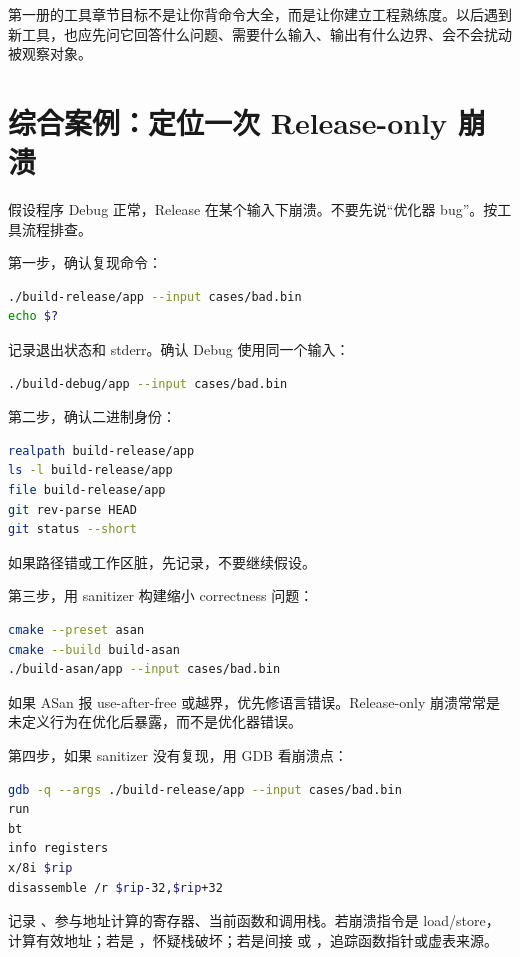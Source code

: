 第一册的工具章节目标不是让你背命令大全，而是让你建立工程熟练度。以后遇到新工具，也应先问它回答什么问题、需要什么输入、输出有什么边界、会不会扰动被观察对象。

\section{综合案例：定位一次 Release-only 崩溃}

假设程序 Debug 正常，Release 在某个输入下崩溃。不要先说“优化器 bug”。按工具流程排查。

第一步，确认复现命令：

\begin{lstlisting}[language=bash]
./build-release/app --input cases/bad.bin
echo $?
\end{lstlisting}

记录退出状态和 stderr。确认 Debug 使用同一个输入：

\begin{lstlisting}[language=bash]
./build-debug/app --input cases/bad.bin
\end{lstlisting}

第二步，确认二进制身份：

\begin{lstlisting}[language=bash]
realpath build-release/app
ls -l build-release/app
file build-release/app
git rev-parse HEAD
git status --short
\end{lstlisting}

如果路径错或工作区脏，先记录，不要继续假设。

第三步，用 sanitizer 构建缩小 correctness 问题：

\begin{lstlisting}[language=bash]
cmake --preset asan
cmake --build build-asan
./build-asan/app --input cases/bad.bin
\end{lstlisting}

如果 ASan 报 use-after-free 或越界，优先修语言错误。Release-only 崩溃常常是未定义行为在优化后暴露，而不是优化器错误。

第四步，如果 sanitizer 没有复现，用 GDB 看崩溃点：

\begin{lstlisting}[language=bash]
gdb -q --args ./build-release/app --input cases/bad.bin
run
bt
info registers
x/8i $rip
disassemble /r $rip-32,$rip+32
\end{lstlisting}

记录 、参与地址计算的寄存器、当前函数和调用栈。若崩溃指令是 load/store，计算有效地址；若是 ，怀疑栈破坏；若是间接  或 ，追踪函数指针或虚表来源。

